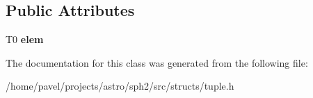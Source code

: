 \subsection*{Public Attributes}
\begin{DoxyCompactItemize}
\item 
\hypertarget{classTupleImpl_3_01T0_00_01TArgs_8_8_8_01_4_afcd4586a63f45771de8a183af669fb8a}{}\label{classTupleImpl_3_01T0_00_01TArgs_8_8_8_01_4_afcd4586a63f45771de8a183af669fb8a} 
T0 {\bfseries elem}
\end{DoxyCompactItemize}


The documentation for this class was generated from the following file\+:\begin{DoxyCompactItemize}
\item 
/home/pavel/projects/astro/sph2/src/structs/tuple.\+h\end{DoxyCompactItemize}
